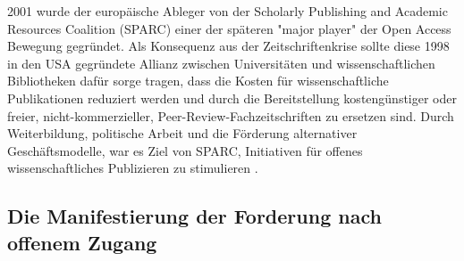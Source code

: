 2001 wurde der europäische Ableger von der Scholarly Publishing and Academic Resources Coalition (SPARC) einer der späteren "major player" der Open Access Bewegung \cite{russell2008business} \cite{Herb_2012} gegründet. Als Konsequenz aus der Zeitschriftenkrise sollte diese 1998 in den USA gegründete Allianz zwischen Universitäten und wissenschaftlichen Bibliotheken dafür sorge tragen, dass die Kosten für wissenschaftliche Publikationen reduziert werden und durch die Bereitstellung kostengünstiger oder freier, nicht-kommerzieller, Peer-Review-Fachzeitschriften zu ersetzen sind. Durch Weiterbildung, politische Arbeit und die Förderung alternativer Geschäftsmodelle, war es Ziel von SPARC, Initiativen für offenes wissenschaftliches Publizieren zu stimulieren \cite{suchen}.

\subsection{Die Manifestierung der Forderung nach offenem Zugang}

